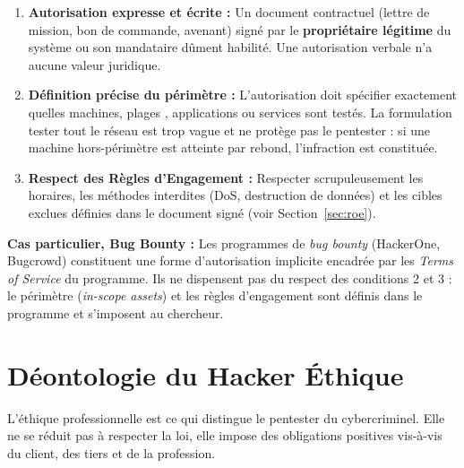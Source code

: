 \begin{enumerate}
    \item \textbf{Autorisation expresse et écrite :} Un document contractuel
          (lettre de mission, bon de commande, avenant) signé par le
          \textbf{propriétaire légitime} du système ou son mandataire dûment
          habilité. Une autorisation verbale n'a aucune valeur juridique.

    \item \textbf{Définition précise du périmètre :} L'autorisation doit
          spécifier exactement quelles machines, plages , applications
          ou services sont testés. La formulation \og{}tester tout le réseau\fg{}
          est trop vague et ne protège pas le pentester : si une machine
          hors-périmètre est atteinte par rebond, l'infraction est constituée.

    \item \textbf{Respect des Règles d'Engagement :} Respecter scrupuleusement
          les horaires, les méthodes interdites (DoS, destruction de données)
          et les cibles exclues définies dans le document  signé
          (voir Section~\ref{sec:roe}).
\end{enumerate}

\begin{boxinfo}
\textbf{Cas particulier, Bug Bounty :} Les programmes de \textit{bug bounty}
(HackerOne, Bugcrowd) constituent une forme d'autorisation implicite encadrée
par les \textit{Terms of Service} du programme. Ils ne dispensent pas du
respect des conditions 2 et 3 : le périmètre (\textit{in-scope assets}) et
les règles d'engagement sont définis dans le programme et s'imposent au
chercheur.
\end{boxinfo}

\section{Déontologie du Hacker Éthique}
\label{sec:deontologie}

L'éthique professionnelle est ce qui distingue le pentester du cybercriminel.
Elle ne se réduit pas à respecter la loi, elle impose des obligations positives
vis-à-vis du client, des tiers et de la profession.

